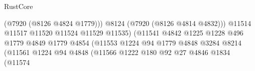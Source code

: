 \begin{lexlean}{RustCore}
\begin{coremodule}
                                                                  (@7920 (@8126 @4824 @1779)))
                                                                @8124
                                                                (@7920 (@8126 @4814 @4832)))
                                                              @11514
                                                              @11517
                                                              @11520
                                                              @11524
                                                              @11529
                                                              @11535)
                                                            (@11541
                                                              @4842
                                                              @1225
                                                              @1228
                                                              @496
                                                              @1779
                                                              @4849
                                                              @1779
                                                              @4854
                                                              (@11553
                                                                @1224
                                                                @94
                                                                @1779
                                                                @4848
                                                                @3284
                                                                @8214
                                                                (@11561
                                                                  @1224
                                                                  @94
                                                                  @4848
                                                                  (@11566
                                                                    @1222
                                                                    @180
                                                                    @92
                                                                    @27
                                                                    @4846
                                                                    @1834
                                                                    (@11574

\end{coremodule}
\end{lexlean}

